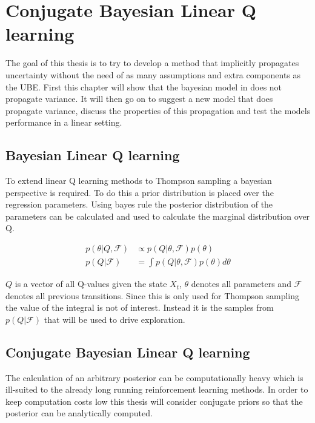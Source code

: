 \chapter{Conjugate Bayesian Linear Q learning}{\label{ch:linear}}

The goal of this thesis is to try to develop a method that implicitly propagates uncertainty without the need of as many assumptions and extra components as the UBE. First this chapter will show that the bayesian model in \cite{azziz_2018} does not propagate variance. It will then go on to suggest a new model that does propagate variance, discuss the properties of this propagation and test the models performance in a linear setting. 

\section{Bayesian Linear Q learning}

To extend linear Q learning methods to Thompson sampling a bayesian perspective is required. To do this a prior distribution is placed over the regression parameters. Using bayes rule the posterior distribution of the parameters can be calculated and used to calculate the marginal distribution over Q.

\begin{align*}
    p(\theta |Q, \mathcal{F}) &\propto p(Q| \theta, \mathcal{F})p(\theta) \\
    p(Q|\mathcal{F}) &= \int p(Q|\theta, \mathcal{F}) p(\theta) d\theta
\end{align*}

$Q$ is a vector of all Q-values given the state $X_t$, $\theta$ denotes all parameters and $\mathcal{F}$ denotes all previous transitions. Since this is only used for Thompson sampling the value of the integral is not of interest. Instead it is the samples from $p(Q|\mathcal{F})$ that will be used to drive exploration.

\section{Conjugate Bayesian Linear Q learning}

The calculation of an arbitrary posterior can be computationally heavy which is ill-suited to the already long running reinforcement learning methods. In order to keep computation costs low this thesis will consider conjugate priors so that the posterior can be analytically computed.

